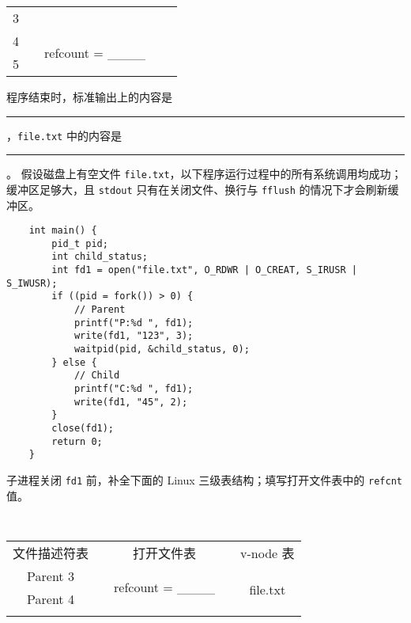 \begin{problems}
\begin{table}[H]
\begin{tabular}{ccccc}
                \multicolumn{1}{|c|}{3} &  &  & \multicolumn{1}{c|}{} & \multicolumn{1}{c|}{} \\ \cline{1-1} \cline{3-3}
                \multicolumn{1}{|c|}{4} & \multicolumn{1}{c|}{} & \multicolumn{1}{c|}{\multirow{2}{*}{refcount = \_\_\_\_}} & \multicolumn{1}{c|}{} & \multicolumn{1}{c|}{} \\ \cline{1-1}
                \multicolumn{1}{|c|}{5} & \multicolumn{1}{c|}{} & \multicolumn{1}{c|}{} & \multicolumn{1}{c|}{} & \multicolumn{1}{c|}{} \\ \cline{1-1} \cline{3-3} \cline{5-5} 
            \end{tabular}
        \end{table}
        \qn 程序结束时，标准输出上的内容是 \rule{3.5cm}{0.25mm}，\verb|file.txt| 中的内容是 \rule{3.5cm}{0.25mm}。
        \pro 假设磁盘上有空文件 \verb|file.txt|，以下程序运行过程中的所有系统调用均成功；缓冲区足够大，且 \verb|stdout| 只有在关闭文件、换行与 \verb|fflush| 的情况下才会刷新缓冲区。
        \begin{verbatim}
    int main() {
        pid_t pid;
        int child_status;
        int fd1 = open("file.txt", O_RDWR | O_CREAT, S_IRUSR | S_IWUSR); 
        if ((pid = fork()) > 0) {
            // Parent
            printf("P:%d ", fd1);
            write(fd1, "123", 3);
            waitpid(pid, &child_status, 0);
        } else {
            // Child
            printf("C:%d ", fd1);
            write(fd1, "45", 2);
        } 
        close(fd1);
        return 0;
    }
        \end{verbatim}
        \qn 子进程关闭 \verb|fd1| 前，补全下面的 Linux 三级表结构；填写打开文件表中的 \verb|refcnt| 值。
        \begin{table}[H]
            \tt
            \centering
            \begin{tabular}{ccccc}
                文件描述符表 & {\qquad \qquad \qquad} & 打开文件表 & {\qquad \qquad \qquad} & v-node 表 \\ \cline{1-1} \cline{3-3} \cline{5-5} 
                \multicolumn{1}{|c|}{Parent 3} & \multicolumn{1}{c|}{} & \multicolumn{1}{c|}{\multirow{2}{*}{refcount = \_\_\_\_}} & \multicolumn{1}{c|}{} & \multicolumn{1}{c|}{\multirow{6}{*}{file.txt}} \\ \cline{1-1}
                \multicolumn{1}{|c|}{Parent 4} & \multicolumn{1}{c|}{} & \multicolumn{1}{c|}{} & \multicolumn{1}{c|}{} & \multicolumn{1}{c|}{} \\ \cline{1-1} \cline{3-3}
                &  &  & \multicolumn{1}{c|}{} & \multicolumn{1}{c|}{} \\

\end{tabular}
\end{table}
\end{problems}
